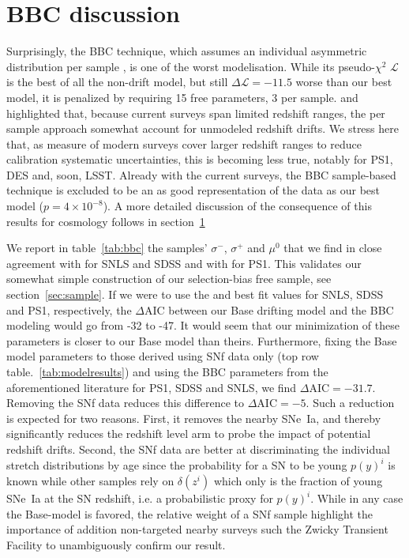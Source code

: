 \documentclass[]{aa} %
\newcommand{\mr}[1]{{\textcolor[rgb]{0.60,0.10,0.6}{#1}}}
\newcommand{\nn}[1]{{\textcolor[rgb]{1, 0.27, 0}{#1}}}
\begin{document}
\section{\nn{BBC discussion}}
\label{sec:bbc}
\mr{Surprisingly, the BBC technique, which assumes an individual asymmetric
    distribution per sample \citep{scolnic2016,kessler2017}, is one of the worst
    modelisation. While its pseudo-$\chi^{2}$ $\mathcal{L}$ is the best of all
    the non-drift model, but still $\Delta \mathcal{L}=-11.5$ worse than our
    best model, it is penalized by requiring 15 free parameters, 3 per sample.
    \citet[][section~2]{scolnic2016} and \citet[][section~5.4]{scolnic2018a}
    highlighted that, because current surveys span limited redshift ranges, the
    per sample approach somewhat account for unmodeled redshift drifts. We
    stress here that, as measure of modern surveys cover larger redshift ranges
    to reduce calibration systematic  uncertainties, this is becoming less true,
    notably for PS1, DES and, soon, LSST. Already with the current surveys, the
    BBC sample-based technique is excluded to be an as good representation of
    the data as our best model ($p=4\times 10^{-8}$). A more detailed discussion
    of the consequence of this results for cosmology follows in
section~\ref{sec:bbc}}

\mr{We report in table~\ref{tab:bbc} the samples' $\sigma^-$, $\sigma^+$ and
    $\mu^0$ that we find in close agreement with \cite{scolnic2016} for SNLS and
    SDSS and with \cite{scolnic2018a} for PS1. This validates our somewhat
    simple construction of our selection-bias free sample, see
    section~\ref{sec:sample}. If we were to use the \cite{scolnic2016} and
    \cite{scolnic2018a} best fit values for SNLS, SDSS and PS1, respectively,
    the $\Delta\mathrm{AIC}$ between our Base drifting model and the BBC
    modeling would go from -32 to -47. \nn{It would seem that our minimization
    of these parameters is closer to our Base model than theirs}. Furthermore,
    fixing the Base model parameters to those derived using SNf data only (top
    row table.~\ref{tab:modelresults}) and using the BBC parameters from the
    aforementioned literature for PS1, SDSS and SNLS, we find
    $\Delta\mathrm{AIC}=-31.7$. Removing the SNf data reduces this difference to
    $\Delta\mathrm{AIC}=-5$. Such a reduction is expected for two reasons.
    First, it removes the nearby SNe~Ia, and thereby significantly reduces the
    redshift level arm to probe the impact of potential redshift drifts.
    Second, the SNf data are better at discriminating the individual stretch
    distributions by age since the probability for a SN to be young $p(y)^i$ is
    known while other samples rely on $\delta(z^i)$ which only is the fraction
    of young SNe~Ia at the SN redshift, i.e. a probabilistic proxy for $p(y)^i$.
    While in any case the Base-model is favored, the relative weight of a SNf
    sample highlight the importance of addition non-targeted nearby surveys such
    the Zwicky Transient Facility \cite[ZTF,][]{bellm2019,graham2019} to
unambiguously confirm our result.}
\end{document}
